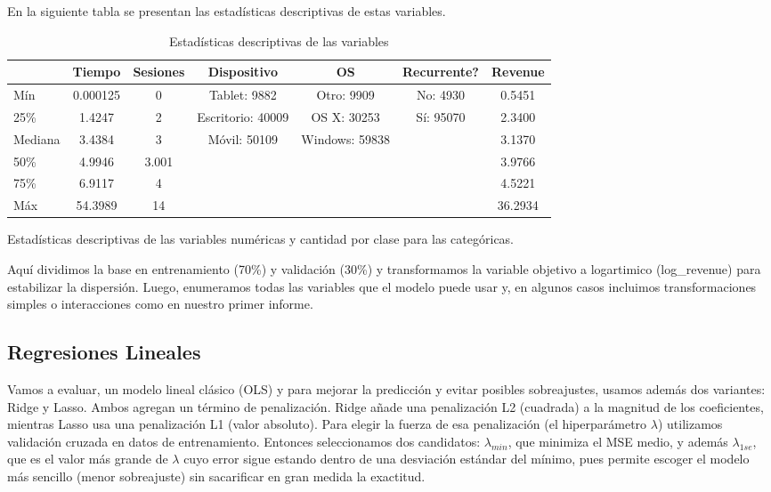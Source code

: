 \documentclass[conference]{IEEEtran}
\begin{document}
En la siguiente tabla se presentan las estadísticas descriptivas de estas variables.


\begin{table}[H]
\tiny
\centering
\caption{Estadísticas descriptivas de las variables}
\begin{tabular}{|l|c|c|c|c|c|c|}
\hline
 & \textbf{Tiempo} & \textbf{Sesiones} & \textbf{Dispositivo} & \textbf{OS} & \textbf{Recurrente?} & \textbf{Revenue} \\
\hline
Mín & 0.000125 & 0 & Tablet: 9882 & Otro: 9909 & No: 4930 & 0.5451 \\
25\% & 1.4247 & 2 & Escritorio: 40009 & OS X: 30253 & Sí: 95070 & 2.3400 \\
Mediana & 3.4384 & 3 & Móvil: 50109 & Windows: 59838 & & 3.1370 \\
50\% & 4.9946 & 3.001 & & & & 3.9766 \\
75\%  & 6.9117 & 4  & & & & 4.5221 \\
Máx & 54.3989 & 14  & & & & 36.2934 \\
\hline
\end{tabular}

\hfill \break
Estadísticas descriptivas de las variables numéricas y cantidad por clase para las categóricas.

\end{table}

Aquí dividimos la base en entrenamiento (70\%) y validación (30\%) y transformamos la variable objetivo a logartimico (log\_revenue) para estabilizar la dispersión. Luego, enumeramos todas las variables que el modelo puede usar y, en algunos casos incluimos transformaciones simples o interacciones como en nuestro primer informe. 


\subsection{Regresiones Lineales}

Vamos a evaluar, un modelo lineal clásico (OLS) y para mejorar la predicción y evitar posibles sobreajustes, usamos además dos variantes: Ridge y Lasso.  Ambos agregan un término de penalización. Ridge añade una penalización L2 (cuadrada) a la magnitud de los coeficientes, mientras Lasso usa una penalización L1 (valor absoluto). Para elegir la fuerza de esa penalización (el hiperparámetro $\lambda$) utilizamos validación cruzada en datos de entrenamiento. Entonces seleccionamos dos candidatos: $\lambda_{min}$, que minimiza el MSE medio, y además $\lambda_{1se}$, que es el valor más grande de $\lambda$ cuyo error sigue estando dentro de una desviación estándar del mínimo, pues permite escoger el modelo más sencillo (menor sobreajuste) sin sacarificar en gran medida la exactitud.
\end{document}
